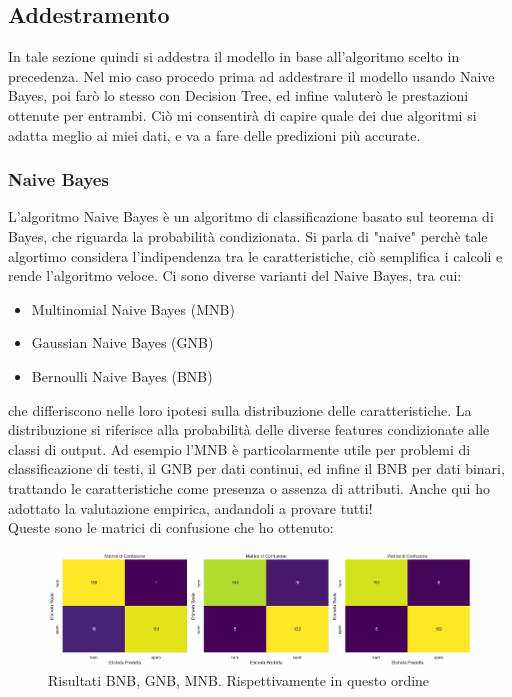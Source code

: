 \documentclass[]{article}
\begin{document}
            \subsection{Addestramento}
                In tale sezione quindi si addestra il modello in base all'algoritmo scelto in precedenza. Nel mio caso procedo prima ad addestrare il modello usando Naive Bayes, poi farò lo stesso con Decision Tree, ed infine valuterò le prestazioni ottenute per entrambi. Ciò mi consentirà di capire quale dei due algoritmi si adatta meglio ai miei dati, e va a fare delle predizioni più accurate.\\

                \subsubsection{Naive Bayes}
                    L'algoritmo Naive Bayes \cite{wikiNaiveBayes} è un algoritmo di classificazione basato sul teorema di Bayes, che riguarda la probabilità condizionata. Si parla di  "naive" perchè tale algortimo considera l'indipendenza tra le caratteristiche, ciò semplifica i calcoli e rende l'algoritmo veloce. Ci sono diverse varianti del Naive Bayes, tra cui:
                    \begin{itemize}
                        \item Multinomial Naive Bayes (MNB)
                        \item  Gaussian Naive Bayes (GNB)
                        \item Bernoulli Naive Bayes (BNB)
                    \end{itemize}
                    che differiscono nelle loro ipotesi sulla distribuzione delle caratteristiche. La distribuzione si riferisce alla probabilità delle diverse features condizionate alle classi di output. Ad esempio l'MNB è particolarmente utile per problemi di classificazione di testi, il GNB per dati continui, ed infine il BNB per dati binari, trattando le caratteristiche come presenza o assenza di attributi. Anche qui ho adottato la valutazione empirica, andandoli a provare tutti! \\
                    Queste sono le matrici di confusione che ho ottenuto:
                    \begin{figure}[H]
                        \centering
                        \includegraphics[width=1.1\linewidth]{images/naiveBayesResults.jpg}
                        \caption{Risultati BNB, GNB, MNB. Rispettivamente in questo ordine}
                        \label{fig:enter-label}
                    \end{figure}
\end{document}
